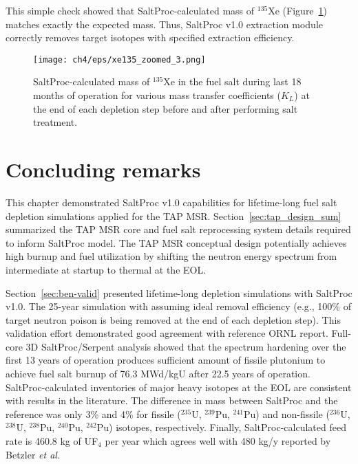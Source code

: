 This simple check showed that SaltProc-calculated mass of $^{135}$Xe 
(Figure~\ref{fig:xe135-eps-var-zoomes}) matches exactly the expected mass. 
Thus, SaltProc v1.0 extraction module correctly removes target isotopes with 
specified extraction efficiency.

\begin{figure}[htp!] %
	\centering
	\texttt{[image: ch4/eps/xe135\_zoomed\_3.png]}
	\caption{SaltProc-calculated mass of $^{135}$Xe in the fuel salt during 
	last 18 months of operation for various mass transfer coefficients ($K_L$) 
	at the end of each depletion step before and after performing salt 
	treatment.}
	\label{fig:xe135-eps-var-zoomes}
\end{figure}
\FloatBarrier




\section{Concluding remarks}
This chapter demonstrated SaltProc v1.0 capabilities for lifetime-long fuel 
salt depletion simulations applied for the \gls{TAP} \gls{MSR}. 
Section~\ref{sec:tap_design_sum} summarized the \gls{TAP} \gls{MSR} core and 
fuel salt reprocessing system details required to inform SaltProc model. The 
\gls{TAP} \gls{MSR} conceptual design potentially achieves high burnup and 
fuel utilization by shifting the neutron energy spectrum from intermediate at 
startup to thermal at the \gls{EOL}. 
 
Section~\ref{sec:ben-valid} presented lifetime-long depletion simulations with 
SaltProc v1.0. The 25-year simulation with assuming ideal removal efficiency 
(e.g., 100\% of target neutron poison is being removed at the end of each 
depletion step). This validation effort demonstrated good agreement with 
reference ORNL report. Full-core 3D SaltProc/Serpent analysis 
showed that the spectrum hardening over the first 13 years of operation 
produces sufficient amount of fissile plutonium to achieve fuel salt 
burnup of 76.3 MWd/kgU after 22.5 years of operation. SaltProc-calculated 
inventories of major heavy isotopes at the \gls{EOL} are consistent with 
results in the literature. The difference in mass between SaltProc and the 
reference was only 3\% and 4\% for fissile ($^{235}$U, $^{239}$Pu, $^{241}$Pu) 
and non-fissile ($^{236}$U, $^{238}$U, $^{238}$Pu, $^{240}$Pu, $^{242}$Pu) 
isotopes, respectively. Finally, SaltProc-calculated feed rate is 460.8 kg of 
UF$_4$ per year which agrees well with 480 kg/y reported by Betzler \emph{et 
al.} \cite{betzler_assessment_2017-1}

